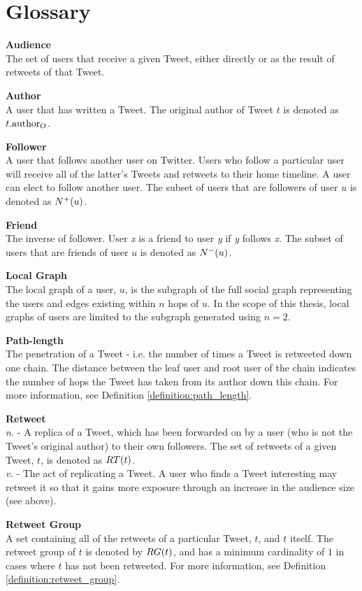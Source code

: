 \chapter*{Glossary} 

{\bf Audience}\\
The set of users that receive a given Tweet, either directly or as the result of retweets of that Tweet.

{\bf Author}\\
A user that has written a Tweet. The original author of Tweet $t$ is denoted as $t.\textrm{author}_O$. 

{\bf Follower}\\
A user that follows another user on Twitter. Users who follow a particular user will receive all of the latter's Tweets and retweets to their home timeline. A user can elect to follow another user. The subset of users that are followers of user $u$ is denoted as $N^+(u)$.

{\bf Friend}\\
The inverse of follower. User \textit{x} is a friend to user \textit{y} if \textit{y} follows \textit{x}. The subset of users that are friends of user $u$ is denoted as $N^-(u)$.

{\bf Local Graph}\\
The local graph of a user, $u$, is the subgraph of the full social graph representing the users and edges existing within $n$ hops of $u$. In the scope of this thesis, local graphs of users are limited to the subgraph generated using $n=2$.

{\bf Path-length}\\
The penetration of a Tweet - i.e. the number of times a Tweet is retweeted down one chain. The distance between the leaf user and root user of the chain indicates the number of hops the Tweet has taken from its author down this chain. For more information, see Definition \ref{definition:path_length}.
			
{\bf Retweet}\\
\textit{n.} - A replica of a Tweet, which has been forwarded on by a user (who is not the Tweet's original author) to their own followers. The set of retweets of a given Tweet, $t$, is denoted as $RT(t)$.\\
\textit{v.} - The act of replicating a Tweet. A user who finds a Tweet interesting may retweet it so that it gains more exposure through an increase in the audience size (see above).
									
{\bf Retweet Group}\\
A set containing all of the retweets of a particular Tweet, $t$, and $t$ itself. The retweet group of $t$ is denoted by $RG(t)$, and has a minimum cardinality of $1$ in cases where $t$ has not been retweeted. For more information, see Definition \ref{definition:retweet_group}.

